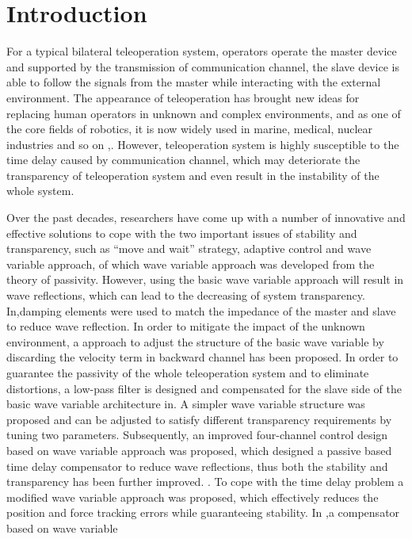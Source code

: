 \section{Introduction}
For a typical bilateral teleoperation system, 
operators operate the master device and supported
by the transmission of communication channel, 
the slave device is able to follow the signals from the master while interacting with the external environment.
The appearance of teleoperation has brought new ideas
for replacing human operators in unknown and complex environments,
and as one of the core fields of robotics,
it is now widely used in marine, medical,
nuclear industries and so on \cite{b1},\cite{b2}.
However,
teleoperation system is highly susceptible to the time delay caused by communication channel,
which may deteriorate the transparency of teleoperation system 
and even result in the instability of the whole system\cite{b3}.
\par Over the past decades, 
researchers have come up with a number of innovative and effective solutions
to cope with the two important issues of stability and transparency,
such as ``move and wait'' strategy\cite{b4}, adaptive control and
wave variable approach, of which wave variable approach was
developed from the theory of passivity\cite{b5}.
However, using the basic wave variable approach will result in wave reflections,
which can lead to the decreasing  of system transparency.
In\cite{b6},damping elements were used to match the impedance of 
the master and slave to reduce wave reflection.
In order to mitigate the impact of the unknown environment, 
a approach to adjust the structure of the basic wave variable 
by discarding the velocity term in backward channel has been proposed\cite{b7}.
In order to guarantee the passivity of the whole teleoperation system 
and to eliminate distortions, a low-pass filter is designed 
and compensated for the slave side of the basic wave variable architecture in\cite{b8}.
A simpler wave variable structure was proposed and can
be adjusted to satisfy different transparency requirements by tuning two parameters\cite{b9}.
Subsequently, an improved four-channel control design based on wave variable approach 
was proposed, which designed a passive based time delay compensator to reduce wave reflections, 
thus both the stability and transparency has been further improved. \cite{b10}.
To cope with the time delay problem a modified wave variable approach was proposed,
which effectively reduces the position and force tracking errors while guaranteeing stability\cite{b11}.
In \cite{b12},a compensator based on wave variable
